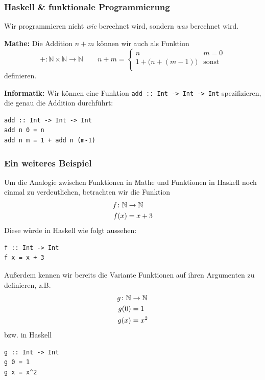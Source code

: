 \documentclass{beamer}
\begin{document}
    \begin{frame}[fragile] \frametitle{Haskell \& funktionale Programmierung}
    	\footnotesize
        
        Wir programmieren nicht \textit{wie} berechnet wird, sondern \textit{was} berechnet wird.
    	
    	\pause
        \medskip
        \textbf{Mathe:} Die Addition $n + m$ können wir auch als Funktion  
        \begin{equation*}
            + \colon \mathbb{N} \times \mathbb{N} \to \mathbb{N} \qquad
            n+m = 
            \begin{cases}
            n & m=0 \\
            1 + \Big( n + (m-1) \Big) &\text{sonst} \\
            \end{cases}
        \end{equation*}
        definieren. \\
       
        \medskip \pause
        
        \textbf{Informatik:} Wir können eine Funktion \lstinline{add :: Int -> Int -> Int} spezifizieren, die genau die Addition durchführt:
        \begin{lstlisting}
add :: Int -> Int -> Int
add n 0 = n
add n m = 1 + add n (m-1)
        \end{lstlisting}
    \end{frame}

	\begin{frame}[fragile] \frametitle{Ein weiteres Beispiel}
		\scriptsize
		Um die Analogie zwischen Funktionen in Mathe und Funktionen in Haskell noch einmal zu verdeutlichen, betrachten wir die Funktion
		\begin{equation*}
			\begin{split}
				f \colon \mathbb{N} &\to \mathbb{N} \\
				f(x) &= x + 3
			\end{split}
		\end{equation*}
		Diese würde in Haskell wie folgt aussehen:
		\begin{lstlisting}[basicstyle=\ttfamily]
f :: Int -> Int
f x = x + 3
		\end{lstlisting}
		\pause
		Außerdem kennen wir bereits die Variante Funktionen auf ihren Argumenten zu definieren, z.B.
		\begin{equation*}
			\begin{split}
				g \colon \mathbb{N} &\to \mathbb{N} \\
				g(0) &= 1 \\
				g(x) &= x^2
			\end{split}
		\end{equation*}
		bzw. in Haskell
		\begin{lstlisting}[basicstyle=\ttfamily]
g :: Int -> Int
g 0 = 1
g x = x^2
		\end{lstlisting}
	\end{frame}
\end{document}
